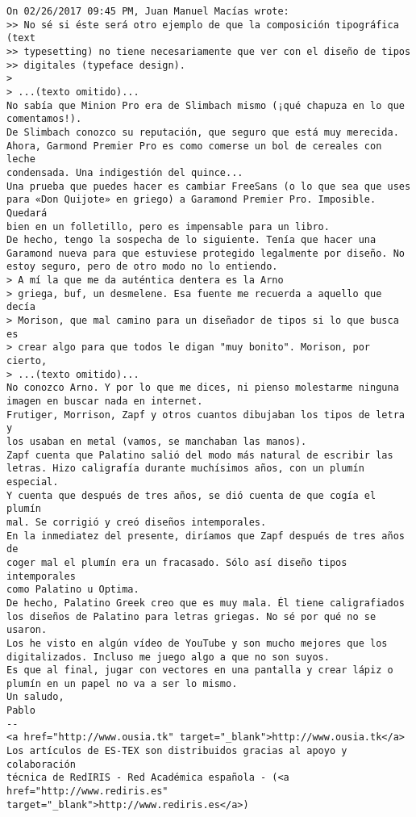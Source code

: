 \documentclass[a4paper,10pt]{article}
\begin{document}
\begin{lstlisting}
On 02/26/2017 09:45 PM, Juan Manuel Macías wrote:
>> No sé si éste será otro ejemplo de que la composición tipográfica (text
>> typesetting) no tiene necesariamente que ver con el diseño de tipos
>> digitales (typeface design).
> 
> ...(texto omitido)...
No sabía que Minion Pro era de Slimbach mismo (¡qué chapuza en lo que
comentamos!).
De Slimbach conozco su reputación, que seguro que está muy merecida.
Ahora, Garmond Premier Pro es como comerse un bol de cereales con leche
condensada. Una indigestión del quince...
Una prueba que puedes hacer es cambiar FreeSans (o lo que sea que uses
para «Don Quijote» en griego) a Garamond Premier Pro. Imposible. Quedará
bien en un folletillo, pero es impensable para un libro.
De hecho, tengo la sospecha de lo siguiente. Tenía que hacer una
Garamond nueva para que estuviese protegido legalmente por diseño. No
estoy seguro, pero de otro modo no lo entiendo.
> A mí la que me da auténtica dentera es la Arno
> griega, buf, un desmelene. Esa fuente me recuerda a aquello que decía
> Morison, que mal camino para un diseñador de tipos si lo que busca es
> crear algo para que todos le digan "muy bonito". Morison, por cierto,
> ...(texto omitido)...
No conozco Arno. Y por lo que me dices, ni pienso molestarme ninguna
imagen en buscar nada en internet.
Frutiger, Morrison, Zapf y otros cuantos dibujaban los tipos de letra y
los usaban en metal (vamos, se manchaban las manos).
Zapf cuenta que Palatino salió del modo más natural de escribir las
letras. Hizo caligrafía durante muchísimos años, con un plumín especial.
Y cuenta que después de tres años, se dió cuenta de que cogía el plumín
mal. Se corrigió y creó diseños intemporales.
En la inmediatez del presente, diríamos que Zapf después de tres años de
coger mal el plumín era un fracasado. Sólo así diseño tipos intemporales
como Palatino u Optima.
De hecho, Palatino Greek creo que es muy mala. Él tiene caligrafiados
los diseños de Palatino para letras griegas. No sé por qué no se usaron.
Los he visto en algún vídeo de YouTube y son mucho mejores que los
digitalizados. Incluso me juego algo a que no son suyos.
Es que al final, jugar con vectores en una pantalla y crear lápiz o
plumín en un papel no va a ser lo mismo.
Un saludo,
Pablo
-- 
<a href="http://www.ousia.tk" target="_blank">http://www.ousia.tk</a>
Los artículos de ES-TEX son distribuidos gracias al apoyo y colaboración 
técnica de RedIRIS - Red Académica española - (<a href="http://www.rediris.es" target="_blank">http://www.rediris.es</a>)

\end{lstlisting}
\end{document}
